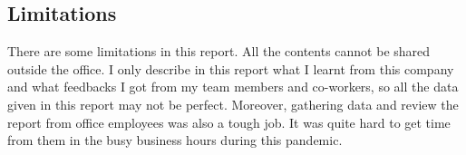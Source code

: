 \begin{flushleft}
\section{Limitations}

There are some limitations in this report. All the contents cannot be shared outside the office. I
only  describe in this report what
I learnt from this company and what feedbacks I got from my team members and co-workers, so
all the data given in this report may not be perfect.
Moreover, gathering data and review the report from office employees was also a tough job. It was quite hard to get time from them in the busy business hours during this pandemic.
\end{flushleft}